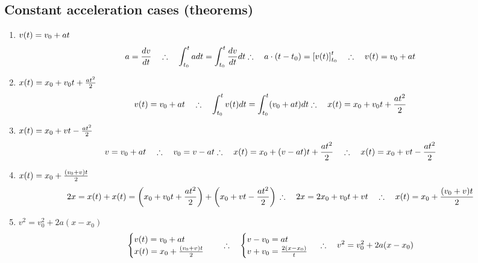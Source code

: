    \subsection{Constant acceleration cases (theorems)}
        \begin{enumerate}
            \item $v(t)=v_0+at$
                \begin{equation}
                    a = \dfrac{dv}{dt} \quad \therefore \quad \int_{t_0}^t a dt=\int_{t_0}^t \dfrac{dv}{dt} dt \\
                    \therefore \quad a \cdot (t-t_ 0)=\left[v(t)\right]_{t_0}^t  \quad \therefore \quad v(t) = v_0 + at
                \end{equation}
            \item $x(t) = x_0 + v_0t + \frac{at^2}{2}$
                \begin{equation}
                    v(t) = v_0 + at \quad \therefore \quad \int_{t_0}^t v(t) dt = \int_{t_0}^t (v_0 + at)dt \\
                    \therefore \quad x(t) = x_0 + v_0t + \frac{at^2}{2}
                \end{equation}
            \item $x(t) = x_0 + vt - \frac{at^2}{2}$
                \begin{equation}
                    v = v_0 + at \quad \therefore \quad v_0=v-at \\
                    \therefore \quad x(t) = x_0 + (v-at)t + \frac{at^2}{2} \quad \therefore \quad x(t) = x_0 + vt - \frac{at^2}{2}
                \end{equation}
            \item $x(t) = x_0 + \frac{(v_0+v)t}{2}$
                \begin{equation}
                    2x = x(t)+x(t) = \left( x_0 + v_0t + \frac{at^2}{2} \right) + \left(x_0 + vt - \frac{at^2}{2}\right) \\
                    \therefore \quad 2x = 2x_0 + v_0t + vt \quad \therefore \quad x(t) = x_0 + \frac{(v_0+v)t}{2}
                \end{equation}
            \item $v^2 = v_0^2 + 2a(x-x_0)$
                \begin{equation}
                    \begin{cases} v(t) = v_0 + at \\
                    x(t) = x_0 + \frac{(v_0+v)t}{2} \end{cases}
                    \quad \therefore \quad \begin{cases}
                        v-v_0=at \\
                        v+v_0 = \frac{2(x-x_0)}{t}
                    \end{cases} \\
                    \therefore \quad v^2 = v_0^2 + 2a(x-x_0)
                \end{equation}
        \end{enumerate}
    
